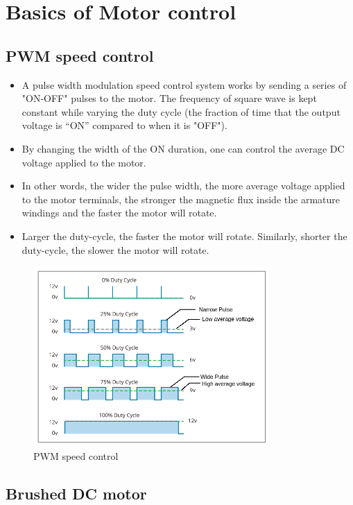 \chapter{Basics of Motor control} \label{Basics_motor_control}

\section{PWM speed control}
\begin{itemize}
    \item A pulse width modulation speed control system works by sending a series of "ON-OFF" pulses to the motor. The frequency of square wave is kept constant while varying the duty cycle (the fraction of time that the output voltage is “ON” compared to when it is "OFF").
    \item By changing the width of the ON duration, one can control the average DC voltage applied to the motor. 
    \item In other words, the wider the pulse width, the more average voltage applied to the motor terminals, the stronger the magnetic flux inside the armature windings and the faster the motor will rotate.
    \item Larger the duty-cycle, the faster the motor will rotate. Similarly, shorter the duty-cycle, the slower the motor will rotate.
\end{itemize}

\begin{figure}[h!]
\centering
\includegraphics[width=9cm]{./Figures/PWM_speed_control.png}
\caption{PWM speed control}
\label{BLDC_runner}
\end{figure}

\section{Brushed DC motor}

